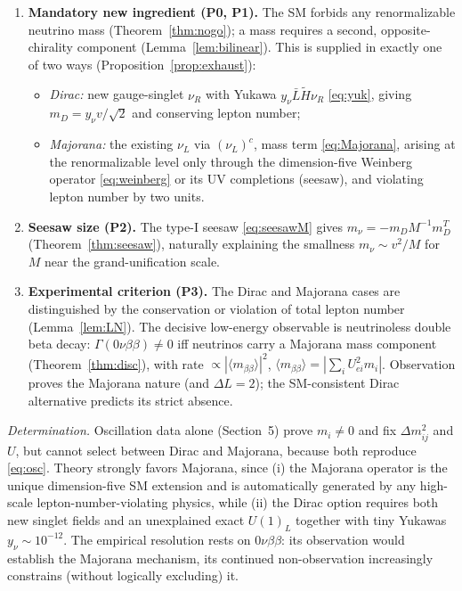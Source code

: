 \documentclass[12pt]{article}
\theoremstyle{definition}
\newcommand{\nuL}{\nu_L}
\newcommand{\nuR}{\nu_R}
\begin{document}
\begin{enumerate}
\item \textbf{Mandatory new ingredient (P0, P1).} The SM forbids any
renormalizable neutrino mass (Theorem~\ref{thm:nogo}); a mass requires a
second, opposite-chirality component (Lemma~\ref{lem:bilinear}). This is
supplied in exactly one of two ways
(Proposition~\ref{prop:exhaust}):
\begin{itemize}
\item \emph{Dirac:} new gauge-singlet $\nuR$ with Yukawa
$y_\nu\bar L\widetilde H\nuR$ \eqref{eq:yuk}, giving
$m_D=y_\nu v/\sqrt2$ and conserving lepton number;
\item \emph{Majorana:} the existing $\nuL$ via $(\nuL)^c$, mass term
\eqref{eq:Majorana}, arising at the renormalizable level only through the
dimension-five Weinberg operator \eqref{eq:weinberg} or its UV
completions (seesaw), and violating lepton number by two units.
\end{itemize}
\item \textbf{Seesaw size (P2).} The type-I seesaw \eqref{eq:seesawM}
gives $m_\nu=-m_DM^{-1}m_D^T$ (Theorem~\ref{thm:seesaw}), naturally
explaining the smallness $m_\nu\sim v^2/M$ for $M$ near the
grand-unification scale.
\item \textbf{Experimental criterion (P3).} The Dirac and Majorana cases
are distinguished by the conservation or violation of total lepton number
(Lemma~\ref{lem:LN}). The decisive low-energy observable is neutrinoless
double beta decay: $\Gamma(0\nu\beta\beta)\neq0$ iff neutrinos carry a
Majorana mass component (Theorem~\ref{thm:disc}), with rate
$\propto|\langle m_{\beta\beta}\rangle|^2$,
$\langle m_{\beta\beta}\rangle=|\sum_iU_{ei}^2m_i|$. Observation proves
the Majorana nature (and $\Delta L=2$); the SM-consistent Dirac
alternative predicts its strict absence.
\end{enumerate}

\noindent\emph{Determination.} Oscillation data alone (Section~5) prove
$m_i\neq0$ and fix $\Delta m^2_{ij}$ and $U$, but cannot select between
Dirac and Majorana, because both reproduce \eqref{eq:osc}. Theory
strongly favors Majorana, since (i) the Majorana operator is the unique
dimension-five SM extension and is automatically generated by any
high-scale lepton-number-violating physics, while (ii) the Dirac option
requires both new singlet fields and an unexplained exact $U(1)_L$
together with tiny Yukawas $y_\nu\sim10^{-12}$. The empirical resolution
rests on $0\nu\beta\beta$: its observation would establish the Majorana
mechanism, its continued non-observation increasingly constrains (without
logically excluding) it.
\end{document}
